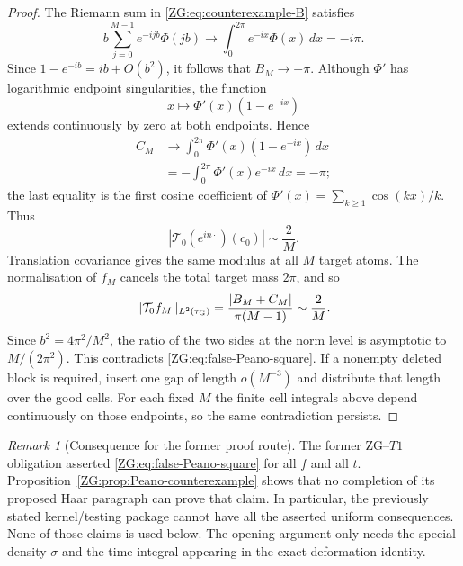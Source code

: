 \documentclass[11pt]{amsart}
\numberwithin{equation}{section}
\theoremstyle{definition}
\theoremstyle{remark}
\newtheorem{remark}[theorem]{Remark}
\begin{document}
\begin{proof}
The Riemann sum in \eqref{ZG:eq:counterexample-B} satisfies
\[
 b\sum_{j=0}^{M-1}e^{-ijb}\Phi(jb)
 \longrightarrow\int_0^{2\pi}e^{-ix}\Phi(x)\,dx=-i\pi.
\]
Since $1-e^{-ib}=ib+O(b^2)$, it follows that $B_M\to-\pi$.
Although $\Phi'$ has logarithmic endpoint singularities, the function
\[
 x\longmapsto\Phi'(x)(1-e^{-ix})
\]
extends continuously by zero at both endpoints.  Hence
\begin{align*}
 C_M&\longrightarrow
 \int_0^{2\pi}\Phi'(x)(1-e^{-ix})\,dx\\
 &= -\int_0^{2\pi}\Phi'(x)e^{-ix}\,dx=-\pi;
\end{align*}
the last equality is the first cosine coefficient of
$\Phi'(x)=\sum_{k\ge1}\cos(kx)/k$.  Thus
\begin{equation}\label{ZG:eq:counterexample-asymptotic}
 |\mathcal T_0(e^{in\cdot})(c_0)|\sim\frac2M.
\end{equation}
Translation covariance gives the same modulus at all $M$ target atoms.
The normalisation of $f_M$ cancels the total target mass $2\pi$, and so
\[
 \|\mathcal T_0f_M\|_{L^2(\tau_{\rm G})}
 =\frac{|B_M+C_M|}{\pi(M-1)}\sim\frac2M.
\]
Since $b^2=4\pi^2/M^2$, the ratio of the two sides at the norm level is
asymptotic to $M/(2\pi^2)$.  This contradicts
\eqref{ZG:eq:false-Peano-square}.  If a nonempty deleted block is required,
insert one gap of length $o(M^{-3})$ and distribute that length over the
good cells.  For each fixed $M$ the finite cell integrals above depend
continuously on those endpoints, so the same contradiction persists.
\end{proof}

\begin{remark}[Consequence for the former proof route]
The former ZG--$T1$ obligation asserted \eqref{ZG:eq:false-Peano-square} for
all $f$ and all $t$.  Proposition~\ref{ZG:prop:Peano-counterexample} shows
that no completion of its proposed Haar paragraph can prove that claim.
In particular, the previously stated kernel/testing package cannot have
all the asserted uniform consequences.  None of those claims is used
below.  The opening argument only needs the special density $\sigma$ and
the time integral appearing in the exact deformation identity.
\end{remark}
\end{document}
